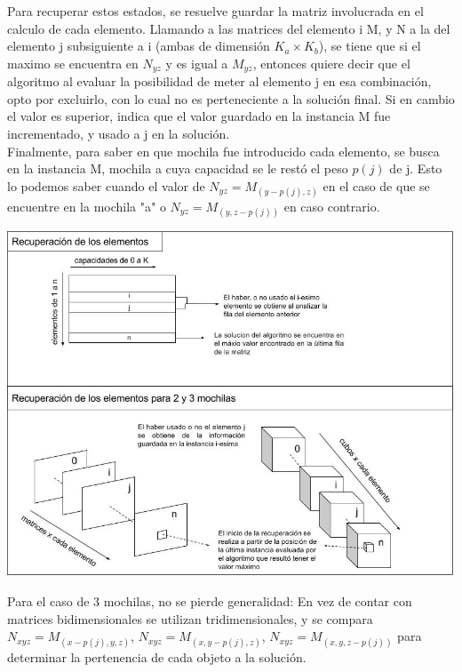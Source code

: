 Para recuperar estos estados, se resuelve guardar la matriz involucrada en el calculo de cada elemento. Llamando a las matrices del elemento i M, y N a la del elemento j subsiguiente a i (ambas de dimensión $K_{a} \times K_{b}$), se tiene que si el maximo se encuentra en $N_{yz}$ y es igual a $M_{yz}$, entonces quiere decir que el algoritmo al evaluar la posibilidad de meter al elemento j en esa combinación, opto por excluirlo, con lo cual no es perteneciente a la solución final. Si en cambio el valor es superior, indica que el valor guardado en la instancia M fue incrementado, y usado a j en la solución.\\

Finalmente, para saber en que mochila fue introducido cada elemento, se busca en la instancia M, mochila a cuya capacidad se le restó el peso $p(j)$ de j. Esto lo podemos saber cuando el valor de $N_{yz} = M_{(y-p(j),z)}$ en el caso de que se encuentre en la mochila "a" o $N_{yz} = M_{(y,z-p(j))}$ en caso contrario.\\

  \vspace*{0.3cm} \vspace*{0.3cm}
  \begin{center}
 \includegraphics[scale=0.6]{./EJ3/dibujo-recuperacion.jpg}
  \end{center}
  \vspace*{0.3cm}

 Para el caso de 3 mochilas, no se pierde generalidad: En vez de contar con matrices bidimensionales se utilizan tridimensionales, y se compara $N_{xyz} = M_{(x-p(j),y,z)}$, $N_{xyz} = M_{(x,y-p(j),z)}$, $N_{xyz} = M_{(x,y,z-p(j))}$ para determinar la pertenencia de cada objeto a la solución.     